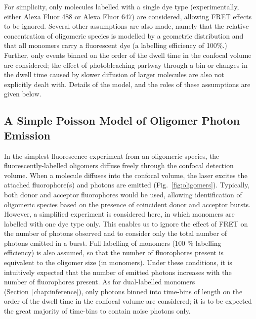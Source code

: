 For simplicity, only molecules labelled with a single dye type (experimentally, either Alexa Fluor 488 or Alexa Fluor 647) are considered, allowing FRET effects to be ignored. Several other assumptions are also made, namely that the relative concentration of oligomeric species is modelled by a geometric distribution and that all monomers carry a fluorescent dye (a labelling efficiency of 100\%.) Further, only events binned on the order of the dwell time in the confocal volume are considered; the effect of photobleaching partway through a bin or changes in the dwell time caused by slower diffusion of larger molecules are also not explicitly dealt with. Details of the model, and the roles of these assumptions are given below.

\subsection{A Simple Poisson Model of Oligomer Photon Emission}
In the simplest fluorescence experiment from an oligomeric species, the fluorescently-labelled oligomers diffuse freely through the confocal detection volume.  When a molecule diffuses into the confocal volume, the laser excites the attached fluorophore(s) and photons are emitted (Fig.~\ref{fig:oligomers}). Typically, both donor and acceptor fluorophores would be used, allowing identification of oligomeric species based on the presence of coincident donor and acceptor bursts. However, a simplified experiment is considered here, in which monomers are labelled with one dye type only. This enables us to ignore the effect of FRET on the number of photons observed and to consider only the total number of photons emitted in a burst. Full labelling of monomers (100 \% labelling efficiency) is also assumed, so that the number of fluorophores present is equivalent to the oligomer size (in monomers). Under these conditions, it is intuitively expected that the number of emitted photons increases with the number of fluorophores present. As for dual-labelled monomers (Section~\ref{chap:inference}), only photons binned into time-bins of length on the order of the dwell time in the confocal volume are considered; it is to be expected the great majority of time-bins to contain noise photons only.

